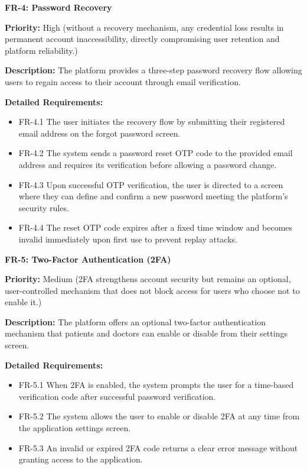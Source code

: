 \medskip

\textbf{FR-4: Password Recovery}

\textbf{Priority:} High (without a recovery mechanism, any credential loss results in permanent account inaccessibility, directly compromising user retention and platform reliability.)

\textbf{Description:} The platform provides a three-step password recovery flow allowing
users to regain access to their account through email verification.

\textbf{Detailed Requirements:}
\begin{itemize}
    \item FR-4.1 \; The user initiates the recovery flow by submitting their registered
    email address on the forgot password screen.
    \item FR-4.2 \; The system sends a password reset OTP code to the provided email
    address and requires its verification before allowing a password change.
    \item FR-4.3 \; Upon successful OTP verification, the user is directed to a screen
    where they can define and confirm a new password meeting the platform's
    security rules.
    \item FR-4.4 \; The reset OTP code expires after a fixed time window and becomes
    invalid immediately upon first use to prevent replay attacks.
\end{itemize}

\medskip

\textbf{FR-5: Two-Factor Authentication (2FA)}

\textbf{Priority:} Medium (2FA strengthens account security but remains an optional, user-controlled mechanism that does not block access for users who choose not to enable it.)

\textbf{Description:} The platform offers an optional two-factor authentication mechanism
that patients and doctors can enable or disable from their settings screen.

\textbf{Detailed Requirements:}
\begin{itemize}
    \item FR-5.1 \; When 2FA is enabled, the system prompts the user for a time-based
    verification code after successful password verification.
    \item FR-5.2 \; The system allows the user to enable or disable 2FA at any time
    from the application settings screen.
    \item FR-5.3 \; An invalid or expired 2FA code returns a clear error message without
    granting access to the application.
\end{itemize}

